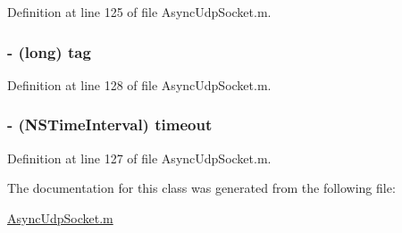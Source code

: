 Definition at line 125 of file AsyncUdpSocket.m.

\hypertarget{interface_async_send_packet_ae10c29173f0af40507d7e787905c7130}{
\subsubsection[{tag}]{\setlength{\rightskip}{0pt plus 5cm}-\/ (long) {\bf tag}}}
\label{interface_async_send_packet_ae10c29173f0af40507d7e787905c7130}


Definition at line 128 of file AsyncUdpSocket.m.

\hypertarget{interface_async_send_packet_a39233eb85b4cbae04411577510e7c5e6}{
\subsubsection[{timeout}]{\setlength{\rightskip}{0pt plus 5cm}-\/ (NSTimeInterval) {\bf timeout}}}
\label{interface_async_send_packet_a39233eb85b4cbae04411577510e7c5e6}


Definition at line 127 of file AsyncUdpSocket.m.



The documentation for this class was generated from the following file:\begin{DoxyCompactItemize}
\item 
\hyperlink{_async_udp_socket_8m}{AsyncUdpSocket.m}\end{DoxyCompactItemize}
